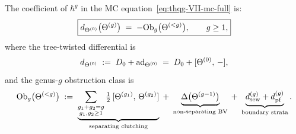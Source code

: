 \begin{proposition}
\label{prop:thqg-VII-genus-g-mc}
The coefficient of $\hbar^g$ in the MC
equation~\eqref{eq:thqg-VII-mc-full} is:
\begin{equation}\label{eq:thqg-VII-genus-g-mc-eq}
\boxed{
d_{\Theta^{(0)}}\bigl(\Theta^{(g)}\bigr)
\;=\;
-\mathrm{Ob}_g\bigl(\Theta^{(<g)}\bigr),
\qquad g \geq 1,
}
\end{equation}
where the tree-twisted differential is
\begin{equation}\label{eq:thqg-VII-d-twisted}
d_{\Theta^{(0)}}
\;:=\;
D_0 + \operatorname{ad}_{\Theta^{(0)}}
\;=\;
D_0 + [\Theta^{(0)},\, -],
\end{equation}
and the genus-$g$ obstruction class is
\begin{equation}\label{eq:thqg-VII-obs-class}
\mathrm{Ob}_g\bigl(\Theta^{(<g)}\bigr)
\;:=\;
\underbrace{
\sum_{\substack{g_1 + g_2 = g \\ g_1, g_2 \geq 1}}
\tfrac{1}{2}\,[\Theta^{(g_1)},\, \Theta^{(g_2)}]
}_{\text{separating clutching}}
\;+\;
\underbrace{
\Delta\bigl(\Theta^{(g-1)}\bigr)
}_{\text{non-separating BV}}
\;+\;
\underbrace{
d_{\mathrm{sew}}^{(g)} + d_{\mathrm{pf}}^{(g)}
}_{\text{boundary strata}}.
\end{equation}
\end{proposition}

